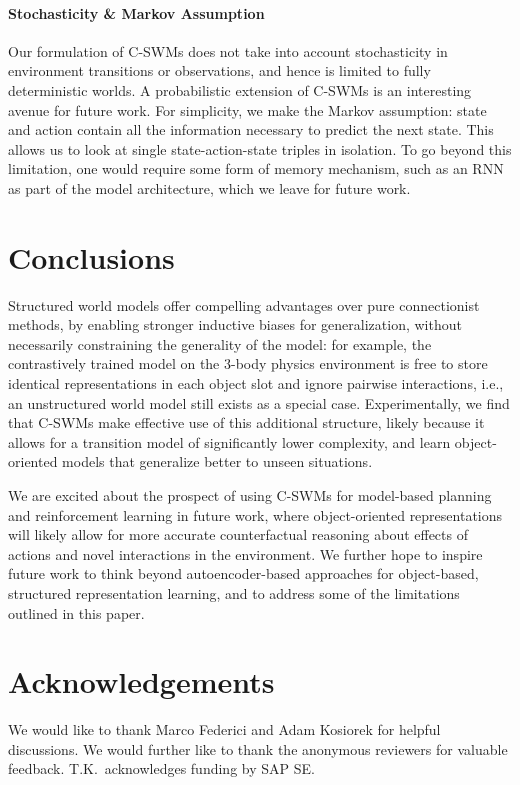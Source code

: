 \documentclass{article} %
\begin{document}
\paragraph{Stochasticity \& Markov Assumption}
Our formulation of C-SWMs does not take into account stochasticity in environment transitions or observations, and hence is limited to fully deterministic worlds. A probabilistic extension of C-SWMs is an interesting avenue for future work.
For simplicity, we make the Markov assumption: state and action contain all the information necessary to predict the next state. This allows us to look at single state-action-state triples in isolation. To go beyond this limitation, one would require some form of memory mechanism, such as an RNN as part of the model architecture, which we leave for future work.

\section{Conclusions}
Structured world models offer compelling advantages over pure connectionist methods, by enabling stronger inductive biases for generalization, without necessarily constraining the generality of the model: for example, the contrastively trained model on the 3-body physics environment is free to store identical representations in each object slot and ignore pairwise interactions, i.e., an unstructured world model still exists as a special case. Experimentally, we find that C-SWMs make effective use of this additional structure, likely because it allows for a transition model of significantly lower complexity, and learn object-oriented models that generalize better to unseen situations.

We are excited about the prospect of using C-SWMs for model-based planning and reinforcement learning in future work, where object-oriented representations will likely allow for more accurate counterfactual reasoning about effects of actions and novel interactions in the environment. We further hope to inspire future work to think beyond autoencoder-based approaches for object-based, structured representation learning, and to address some of the limitations outlined in this paper.

\section*{Acknowledgements}
We would like to thank Marco Federici and Adam Kosiorek
for helpful discussions. We would further like to thank the anonymous reviewers for valuable feedback. T.K.~acknowledges funding by SAP SE.
\end{document}
